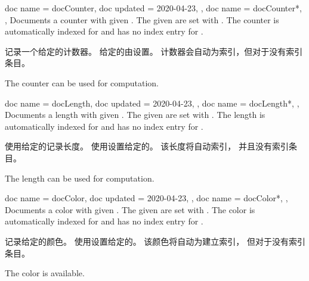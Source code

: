 % 
% 
% 
% 
% 
% 


\begin{docCommands}[doc parameter=\oarg{options}\marg{name}]
{
  {
    doc name    = docCounter,
    doc updated = 2020-04-23,
  },
  {
    doc name = docCounter*,
  },
}
Documents a counter with given .
The given  are set with .
The counter is automatically indexed for 
and has no index entry for .

记录一个给定的计数器。 给定的由设置。 计数器会自动为索引，但对于没有索引条目。
\begin{dispExample}
The counter  can be used for computation.
\end{dispExample}
\end{docCommands}


\begin{docCommands}[doc parameter=\oarg{options}\marg{name}]
{
  {
    doc name    = docLength,
    doc updated = 2020-04-23,
  },
  {
    doc name = docLength*,
  },
}
Documents a length with given .
The given  are set with .
The length is automatically indexed for 
and has no index entry for .

使用给定的记录长度。 使用设置给定的。 该长度将自动索引， 并且没有索引条目。
\begin{dispExample}
The length  can be used for computation.
\end{dispExample}
\end{docCommands}


\begin{docCommands}[doc parameter=\oarg{options}\marg{name}]
{
  {
    doc name    = docColor,
    doc updated = 2020-04-23,
  },
  {
    doc name = docColor*,
  },
}
Documents a color with given .
The given  are set with .
The color is automatically indexed for 
and has no index entry for .

记录给定的颜色。 使用设置给定的。 该颜色将自动为建立索引， 但对于没有索引条目。
\begin{dispExample}
The color  is available.
\end{dispExample}
\end{docCommands}



